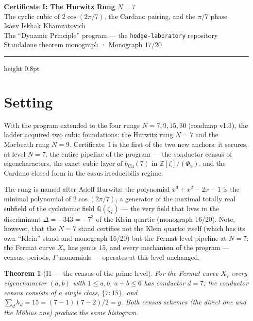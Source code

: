 \documentclass[11pt,a4paper]{article}
\theoremstyle{plain}
\newtheorem{theorem}{Theorem}
\theoremstyle{definition}
\theoremstyle{remark}
\newcommand{\ZZ}{\mathbb{Z}}
\newcommand{\QQ}{\mathbb{Q}}
\newcommand{\Ga}{\Gamma}
\begin{document}
\begin{center}
{\LARGE\bfseries Certificate I: The Hurwitz Rung $N=7$}\\[0.4em]
{\large The cyclic cubic of $2\cos(2\pi/7)$, the Cardano pairing, and the $\pi/7$ phase}\\[0.6em]
{\normalsize Isaev Iskhak Khamzatovich}\\[0.2em]
{\small The ``Dynamic Principle'' program --- the \texttt{hodge-laboratory} repository}\\[0.15em]
{\small Standalone theorem monograph · Monograph 17/20}
\end{center}
\vspace{0.4em}
{\color{linkblue}\hrule height 0.8pt}
\vspace{0.8em}

\section{Setting}

With the program extended to the four rungs $N=7,9,15,30$
(roadmap v1.3), the ladder acquired two cubic foundations: the
Hurwitz rung $N=7$ and the Macbeath rung $N=9$. Certificate~I is
the first of the two new anchors: it secures, at level $N=7$, the
entire pipeline of the program --- the conductor census of
eigencharacters, the exact cubic layer of $b_{\mathrm{Ch}}(7)$ in
$\ZZ[\zeta]/(\Phi_7)$, and the Cardano closed form in the
$\mathrm{casus\ irreducibilis}$ regime.

The rung is named after Adolf Hurwitz: the polynomial
$x^3+x^2-2x-1$ is the minimal polynomial of $2\cos(2\pi/7)$, a
generator of the maximal totally real subfield of the cyclotomic
field $\QQ(\zeta_7)$ --- the very field that lives in the
discriminant $\Delta=-343=-7^3$ of the Klein quartic (monograph
16/20). Note, however, that the $N=7$ stand certifies not the
Klein quartic itself (which has its own ``Klein'' stand and
monograph 16/20) but the Fermat-level pipeline at $N=7$: the
Fermat curve $X_7$ has genus $15$, and every mechanism of the
program --- census, periods, $\Ga$-monomials --- operates at this
level unchanged.

\begin{theorem}[I1 --- the census of the prime level]\label{th:I1}
For the Fermat curve $X_7$ every eigencharacter $(a,b)$ with
$1\le a,b$, $a+b\le 6$ has conductor $d=7$; the conductor census
consists of a single class, $\{7\colon 15\}$, and
$\sum_d h_d = 15 = (7-1)(7-2)/2 = g$. Both census schemes (the
direct one and the M\"obius one) produce the same histogram.
\end{theorem}
\end{document}
